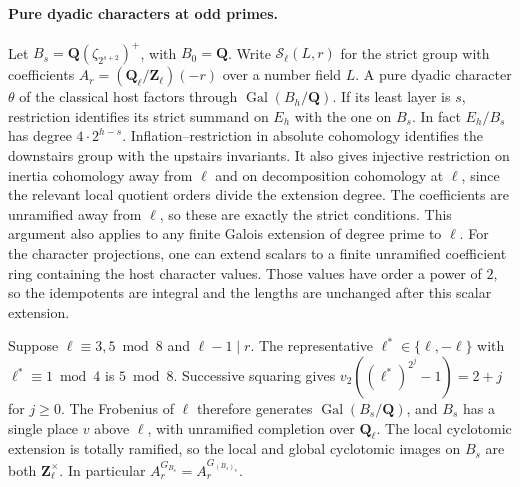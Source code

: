 \paragraph{Pure dyadic characters at odd primes.}
%
Let \(B_s=\mathbf Q(\zeta_{2^{s+2}})^+\), with \(B_0=\mathbf Q\).
Write \(\mathcal S_\ell(L,r)\) for the strict group with coefficients
\(A_r=(\mathbf Q_\ell/\mathbf Z_\ell)(-r)\) over a number field \(L\).
A pure dyadic character \(\theta\) of the classical host factors
through \(\operatorname{Gal}(B_h/\mathbf Q)\). If its least layer is
\(s\), restriction identifies its strict summand on \(E_h\) with the
one on \(B_s\). In fact \(E_h/B_s\) has degree \(4\cdot2^{h-s}\).
Inflation--restriction in absolute cohomology identifies the
downstairs group with the upstairs invariants. It also gives
injective restriction on inertia cohomology away from \(\ell\) and
on decomposition cohomology at \(\ell\), since the relevant local
quotient orders divide the extension degree. The coefficients are
unramified away from \(\ell\), so these are exactly the strict
conditions. This argument also applies to any finite Galois extension
of degree prime to \(\ell\). For the character projections, one can
extend scalars to a finite unramified coefficient ring containing the
host character values. Those values have order a power of \(2\),
so the idempotents are integral and the lengths are unchanged
after this scalar extension.

Suppose \(\ell\equiv3,5\bmod8\) and \(\ell-1\mid r\).
The representative \(\ell^*\in\{\ell,-\ell\}\) with
\(\ell^*\equiv1\bmod4\) is \(5\bmod8\).
Successive squaring gives
\(v_2((\ell^*)^{2^j}-1)=2+j\) for \(j\ge0\).
The Frobenius of \(\ell\) therefore generates
\(\operatorname{Gal}(B_s/\mathbf Q)\), and \(B_s\) has a single place
\(v\) above \(\ell\), with unramified completion over \(\mathbf Q_\ell\).
The local cyclotomic extension is totally ramified, so the local and
global cyclotomic images on \(B_s\) are both \(\mathbf Z_\ell^\times\).
In particular \(A_r^{G_{B_s}}=A_r^{G_{(B_s)_v}}\).


